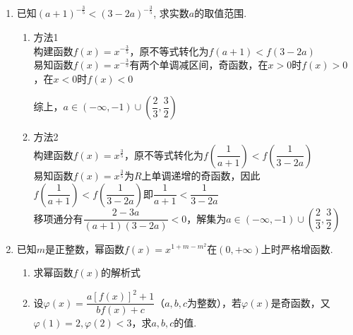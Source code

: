 \begin{enumerate}
\begin{jieda}
        \end{jieda}
        \item 已知$(a+1)^{-\frac{3}{5}}<(3-2a)^{-\frac{3}{5}}$, 求实数$a$的取值范围. 
        \begin{jieda}
        \begin{enumerate}
            \item 方法1 \\
            构建函数$f(x) = x^{-\frac{3}{5}}$，原不等式转化为$f(a+1) < f(3-2a)$ \\
            易知函数$f(x) = x^{-\frac{3}{5}}$有两个单调减区间，奇函数，在$x > 0$时$f(x) > 0$，在$x < 0$时$f(x) < 0$ 
            综上，$a \in (-\infty, -1) \cup \left(\dfrac{2}{3}, \dfrac{3}{2}\right)$
            \item 方法2 \\
            构建函数$f(x) = x^{\frac{3}{5}}$，原不等式转化为$f\left(\dfrac{1}{a+1}\right) < f\left(\dfrac{1}{3-2a}\right)$ \\
            易知函数$f(x) = x^{\frac{3}{5}}$为$R$上单调递增的奇函数，因此$f\left(\dfrac{1}{a+1}\right) < f\left(\dfrac{1}{3-2a}\right)$即$\dfrac{1}{a+1} < \dfrac{1}{3-2a}$ \\
            移项通分有$\dfrac{2-3a}{(a+1)(3-2a)} < 0$，解集为$a \in (-\infty, -1) \cup \left(\dfrac{2}{3}, \dfrac{3}{2}\right)$
        \end{enumerate}
        \end{jieda}
        \item 已知$m$是正整数，幂函数$f(x) = x^{1+m-m^2}$在$(0, +\infty)$上时严格增函数.
        \begin{enumerate}
            \item 求幂函数$f(x)$的解析式
            \item 设$\varphi(x) = \dfrac{a[f(x)]^2+1}{bf(x)+c}$（$a, b, c$为整数），若$\varphi(x)$是奇函数，又$\varphi(1) = 2, \varphi(2) < 3$，求$a, b, c$的值.
        \end{enumerate}

\end{enumerate}

